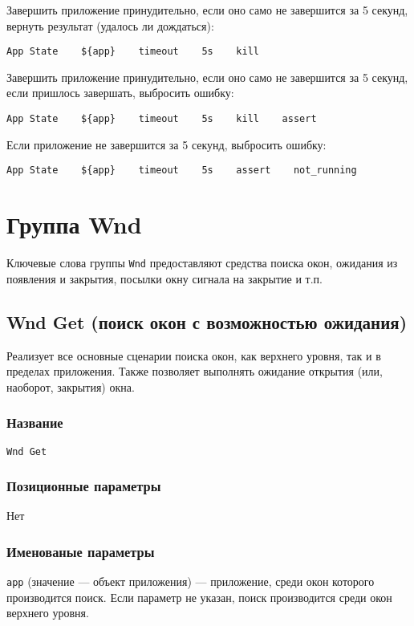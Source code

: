 \documentclass[11pt]{book} %
\begin{document}
Завершить приложение принудительно, если оно само не завершится за 5 секунд, вернуть результат (удалось ли дождаться):
\begin{verbatim}App State    ${app}    timeout    5s    kill\end{verbatim}

Завершить приложение принудительно, если оно само не завершится за 5 секунд, если пришлось завершать, выбросить ошибку:
\begin{verbatim}App State    ${app}    timeout    5s    kill    assert\end{verbatim}

Если приложение не завершится за 5 секунд, выбросить ошибку:
\begin{verbatim}App State    ${app}    timeout    5s    assert    not_running\end{verbatim}


\section{Группа Wnd}
Ключевые слова группы \verb"Wnd" предоставляют средства поиска окон, ожидания из появления и закрытия, посылки окну сигнала на закрытие и т.п.


\subsection{Wnd Get (поиск окон с возможностью ожидания)}
Реализует все основные сценарии поиска окон, как верхнего уровня, так и в пределах приложения. Также позволяет выполнять ожидание открытия (или, наоборот, закрытия) окна.

\subsubsection*{Название}
\verb"Wnd Get"

\subsubsection*{Позиционные параметры}

Нет

\subsubsection*{Именованые параметры} 
\verb"app" (значение --- объект приложения) --- приложение, среди окон которого производится поиск. Если параметр не указан, поиск производится среди окон верхнего уровня.
\end{document}
